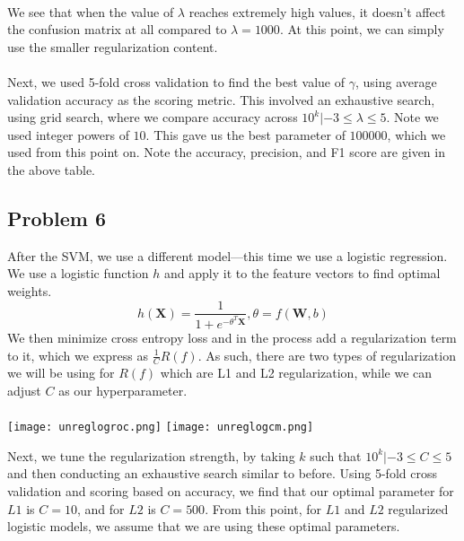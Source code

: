\documentclass[11pt]{article}
\begin{document}
\begin{multicols}{2}
\\
We see that when the value of $\lambda$ reaches extremely high values, it doesn't affect the confusion matrix at all compared to $\lambda=1000$. At this point, we can simply use the smaller regularization content.
\\\\
Next, we used 5-fold cross validation to find the best value of $\gamma$, using average validation accuracy as the scoring metric. This involved an exhaustive search, using grid search, where we compare accuracy across $10^k|-3\leq\lambda\leq 5$. Note we used integer powers of $10$. This gave us the best parameter of $100000$, which we used from this point on. Note the accuracy, precision, and F1 score are given in the above table. 


\subsection*{Problem 6}
After the SVM, we use a different model—this time we use a logistic regression. We use a logistic function $h$ and apply it to the feature vectors to find optimal weights. 
$$h(\textbf{X})=\dfrac{1}{1+e^{-\theta^T\textbf{X}}},\theta=f(\textbf{W},b)$$
We then minimize cross entropy loss and in the process add a regularization term to it, which we express as $\frac{1}{C}R(f)$. As such, there are two types of regularization we will be using for $R(f)$ which are L1 and L2 regularization, while we can adjust $C$ as our hyperparameter. \\\\
\texttt{[image: unreglogroc.png]}
\texttt{[image: unreglogcm.png]}

Next, we tune the regularization strength, by taking $k$ such that $10^k|-3\leq C\leq 5$ and then conducting an exhaustive search similar to before. Using 5-fold cross validation and scoring based on accuracy, we find that our optimal parameter for $L1$ is $C=10$, and for $L2$ is $C=500$. From this point, for $L1$ and $L2$ regularized logistic models, we assume that we are using these optimal parameters. \\


\end{multicols}
\end{document}
